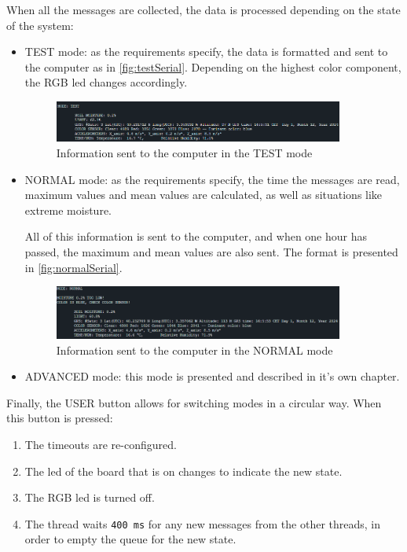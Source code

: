 When all the messages are collected, the data is processed depending on the state of the system:
\begin{itemize}
    \item TEST mode: as the requirements specify, the data is formatted and sent to the computer as in \autoref{fig:testSerial}. Depending on the highest color component, the RGB led changes accordingly.
    \begin{figure}[H]
        \centering
        \includegraphics[width=0.9\textwidth]{images/4/TestSerial.png}
        \caption{Information sent to the computer in the TEST mode}
        \label{fig:testSerial}
    \end{figure}

    \item NORMAL mode: as the requirements specify, the time the messages are read, maximum values and mean values are calculated, as well as situations like extreme moisture.
    
    All of this information is sent to the computer, and when one hour has passed, the maximum and mean values are also sent. The format is presented in \autoref{fig:normalSerial}.
    \begin{figure}[H]
        \centering
        \includegraphics[width=0.9\textwidth]{images/4/NormalSerial.png}
        \caption{Information sent to the computer in the NORMAL mode}
        \label{fig:normalSerial}
    \end{figure}

    \item ADVANCED mode: this mode is presented and described in it's own chapter.%
\end{itemize}

Finally, the USER button allows for switching modes in a circular way. When this button is pressed:
\begin{enumerate}
    \item The timeouts are re-configured.
    \item The led of the board that is on changes to indicate the new state.
    \item The RGB led is turned off.
    \item The thread waits \texttt{400 ms} for any new messages from the other threads, in order to empty the queue for the new state.%
\end{enumerate}


